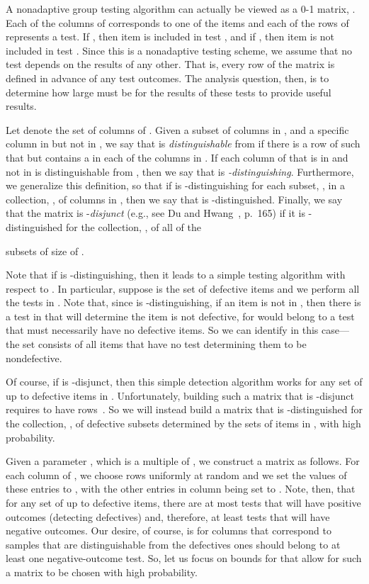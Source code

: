 \documentclass{article}
\begin{document}
A nonadaptive group testing algorithm
can actually be viewed as a  0-1 matrix, .
Each of the  columns of  corresponds to one of the  items
and each of the  rows of  represents a test. 
If , then item  is included in test , and
if , then item  is not included in test .
Since this is a nonadaptive testing scheme, 
we assume that
no test depends on the results of any other.
That is, every row of the matrix  is defined in advance of any
test outcomes.
The analysis question, then, is to determine how large  must be 
for the results of these tests to provide useful results.

Let  denote the set of columns of .
Given a subset  of  columns in , and a specific column 
in  but not in ,
we say that  is \emph{distinguishable} from  if there is a row
 of  such that  but  contains a  in each of the
columns in .
If each column of  that is in  and not in  is 
distinguishable from , then we say that  is 
\emph{-distinguishing}.
Furthermore, we generalize this definition, so that
if  is -distinguishing for each subset, , in a collection,
, 
of columns in ,
then we say that  is -distinguished.
Finally, we say that the matrix  is -{\it disjunct} 
(e.g., see Du and Hwang~\cite{dh-cgtia-00}, p.~165)
if it is -distinguished for the collection, ,
of all of the 

subsets of size
 of .

Note that if  is -distinguishing, 
then it leads to a simple testing
algorithm with respect to .
In particular, suppose  is the set of defective items
and we perform all the tests in .
Note that, since  is -distinguishing,
if an item  is not in , then there is a test
in  that will determine the item 
 is not defective, for  would belong to a test that must
necessarily have no defective items.
So we can identify  in this case---the set  consists of
all items that have no test determining them to be nondefective.

Of course, if  is -disjunct, then this simple detection algorithm works 
for any set  of up to  defective items in .
Unfortunately, building such a matrix  that is -disjunct
requires  to have  
rows~\cite{dh-cgtia-00,R94}.
So we will instead build a matrix that is -distinguished for
the collection, , of defective subsets determined by the sets
of items in , with high probability.

Given a parameter , which is a multiple of ,
we construct a  matrix  as follows.
For each column  of , we choose 
rows uniformly at random and we set the values of these entries to , with
the other entries in column  being set to .
Note, then, that for any set  of up to  defective items,
there are at most  tests that will have positive outcomes
(detecting defectives) and,
therefore, at least  tests that will have negative outcomes.
Our desire, of course, is for 
columns that correspond to samples that are distinguishable from
the defectives ones should belong to at least one negative-outcome test.
So, let us focus on bounds for  that allow for such a matrix 
to be chosen with high probability.
\end{document}

